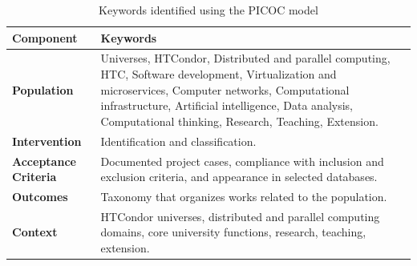 \begin{table}[htbp]
	\centering
	\caption{Keywords identified using the PICOC model}
	\label{table:picoc_keywords}
	\renewcommand{\arraystretch}{1}  %
	\begin{tabular}{p{1.8cm}p{6cm}}
		\toprule
		\textbf{Component}              & \textbf{Keywords}                                                                                                                                                                                                                                                                 \\
		\midrule
		\textbf{Population}               & Universes, HTCondor, Distributed and parallel computing, HTC, Software development, Virtualization and microservices, Computer networks, Computational infrastructure, Artificial intelligence, Data analysis, Computational thinking, Research, Teaching, Extension. \\
		\addlinespace[0.8em]
		\textbf{Intervention}            & Identification and classification.                                                                                                                                                                                                                                                         \\
		\addlinespace[0.8em]
		\textbf{Acceptance Criteria} &
		Documented project cases, compliance with inclusion and exclusion criteria, and appearance in selected databases.                                                                                                                                                                                            \\
		\addlinespace[0.8em]
		\textbf{Outcomes}                 & Taxonomy that organizes works related to the population.                                                                                                                                                                                                                      \\
		\addlinespace[0.8em]
		\textbf{Context}                & HTCondor universes, distributed and parallel computing domains, core university functions, research, teaching, extension.                                                                                                                    \\
		\bottomrule
	\end{tabular}
\end{table}



